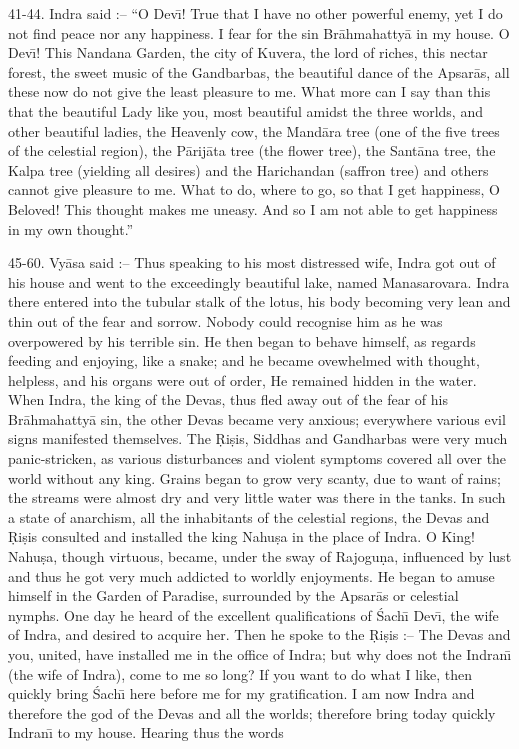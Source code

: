 41-44. Indra said :-- ``O Dev\={\i}! True that I have no other powerful enemy, yet I do not find peace nor any happiness. I fear for the sin Br\=ahmahatty\=a in my house. O Dev\={\i}! This Nandana Garden, the city of Kuvera, the lord of riches, this nectar forest, the sweet music of the Gandbarbas, the beautiful dance of the Apsar\=as, all these now do not give the least pleasure to me. What more can I say than this that the beautiful Lady like you, most beautiful amidst the three worlds, and other beautiful ladies, the Heavenly cow, the Mand\=ara tree (one of the five trees of the celestial region), the P\=arij\=ata tree (the flower tree), the Sant\=ana tree, the Kalpa tree (yielding all desires) and the Harichandan (saffron tree) and others cannot give pleasure to me. What to do, where to go, so that I get happiness, O Beloved! This thought makes me uneasy. And so I am not able to get happiness in my own thought.''

45-60. Vy\=asa said :-- Thus speaking to his most distressed wife, Indra got out of his house and went to the exceedingly beautiful lake, named Manasarovara. Indra there entered into the tubular stalk of the lotus, his body becoming very lean and thin out of the fear and sorrow. Nobody could recognise him as he was overpowered by his terrible sin. He then began to behave himself, as regards feeding and enjoying, like a snake; and he became ovewhelmed with thought, helpless, and his organs were out of order, He remained hidden in the water. When Indra, the king of the Devas, thus fled away out of the fear of his Br\=ahmahatty\=a sin, the other Devas became very anxious; everywhere various evil signs manifested themselves. The \d{R}i\d{s}is, Siddhas and Gandharbas were very much panic-stricken, as various disturbances and violent symptoms covered all over the world without any king. Grains began to grow very scanty, due to want of rains; the streams were almost dry and very little water was there in the tanks. In such a state of anarchism, all the inhabitants of the celestial regions, the Devas and \d{R}i\d{s}is consulted and installed the king Nahu\d{s}a in the place of Indra. O King! Nahu\d{s}a, though virtuous, became, under the sway of Rajogu\d{n}a, influenced by lust and thus he got very much addicted to worldly enjoyments. He began to amuse himself in the Garden of Paradise, surrounded by the Apsar\=as or celestial nymphs. One day he heard of the excellent qualifications of \'Sach\={\i} Dev\={\i}, the wife of Indra, and desired to acquire her. Then he spoke to the \d{R}i\d{s}is :-- The Devas and you, united, have installed me in the office of Indra; but why does not the Indran\={\i} (the wife of Indra), come to me so long? If you want to do what I like, then quickly bring \'Sach\={\i} here before me for my gratification. I am now Indra and therefore the god of the Devas and all the worlds; therefore bring today quickly Indran\={\i} to my house. Hearing thus the words

